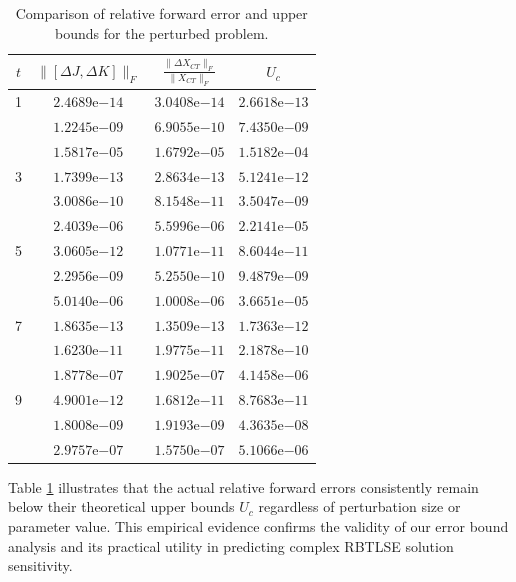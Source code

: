 \documentclass[preprint,11pt,3p]{elsarticle}
\begin{document}
\begin{table}[h]
	\centering
	\small
	\begin{tabular}{c@{\hskip 1.2cm}c@{\hskip 1.2cm}c@{\hskip 1.2cm}c}
		\toprule
		$t$ & $\|[\Delta J, \Delta K]\|_F$ & $\frac{\|\Delta X_{CT}\|_F}{\|X_{CT}\|_F}$ & $U_c$ \\
		\midrule
		1  & $2.4689\text{e}{-14}$ & $3.0408\text{e}{-14}$ & $2.6618\text{e}{-13}$ \\
		& $1.2245\text{e}{-09}$ & $6.9055\text{e}{-10}$ & $7.4350\text{e}{-09}$ \\
		& $1.5817\text{e}{-05}$ & $1.6792\text{e}{-05}$ & $1.5182\text{e}{-04}$ \\
		\midrule
		3  & $1.7399\text{e}{-13}$ & $2.8634\text{e}{-13}$ & $5.1241\text{e}{-12}$ \\
		& $3.0086\text{e}{-10}$ & $8.1548\text{e}{-11}$ & $3.5047\text{e}{-09}$ \\
		& $2.4039\text{e}{-06}$ & $5.5996\text{e}{-06}$ & $2.2141\text{e}{-05}$ \\
		\midrule
		5  & $3.0605\text{e}{-12}$ & $1.0771\text{e}{-11}$ & $8.6044\text{e}{-11}$ \\
		& $2.2956\text{e}{-09}$ & $5.2550\text{e}{-10}$ & $9.4879\text{e}{-09}$ \\
		& $5.0140\text{e}{-06}$ & $1.0008\text{e}{-06}$ & $3.6651\text{e}{-05}$ \\
		\midrule
		7  & $1.8635\text{e}{-13}$ & $1.3509\text{e}{-13}$ & $1.7363\text{e}{-12}$ \\
		& $1.6230\text{e}{-11}$ & $1.9775\text{e}{-11}$ & $2.1878\text{e}{-10}$ \\
		& $1.8778\text{e}{-07}$ & $1.9025\text{e}{-07}$ & $4.1458\text{e}{-06}$ \\
		\midrule
		9  & $4.9001\text{e}{-12}$ & $1.6812\text{e}{-11}$ & $8.7683\text{e}{-11}$ \\
		& $1.8008\text{e}{-09}$ & $1.9193\text{e}{-09}$ & $4.3635\text{e}{-08}$ \\
		& $2.9757\text{e}{-07}$ & $1.5750\text{e}{-07}$ & $5.1066\text{e}{-06}$ \\
		\bottomrule
	\end{tabular}
	\caption{Comparison of relative forward error and upper bounds for the perturbed problem.}
	\label{tab1.11}
\end{table}
Table \ref{tab1.11} illustrates that the actual relative forward errors consistently remain below their theoretical upper bounds $U_c$ regardless of perturbation size or parameter value. This empirical evidence confirms the validity of our error bound analysis and its practical utility in predicting complex RBTLSE solution sensitivity. 
\end{document}
